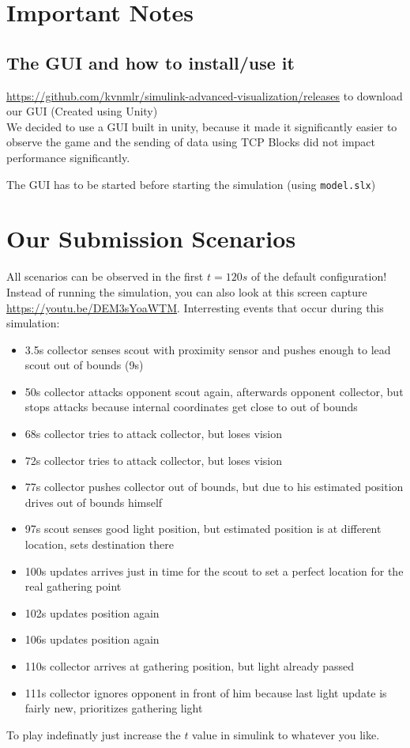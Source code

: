 \documentclass[12pt]{article}
\begin{document}
\lstset{language=C++}

\section*{Important Notes}

\subsection*{The GUI and how to install/use it}
\url{https://github.com/kvnmlr/simulink-advanced-visualization/releases}
to download our GUI (Created using Unity)\\

We decided to use a GUI built in unity, because it made it significantly easier to observe the game and the sending of data using TCP Blocks did not impact performance significantly.

The GUI has to be started before starting the simulation (using \verb!model.slx!)

\section*{Our Submission Scenarios}
All scenarios can be observed in the first $t=120s$ of the default configuration!\\

Instead of running the simulation, you can also look at this screen capture \url{https://youtu.be/DEM3sYoaWTM}. Interresting events that occur during this simulation:
\begin{itemize}
  \item 3.5s collector senses scout with proximity sensor and pushes enough to lead scout out of bounds (9s)
  \item 50s collector attacks opponent scout again, afterwards opponent collector, but stops attacks because internal coordinates get close to out of bounds
  \item 68s collector tries to attack collector, but loses vision
  \item 72s collector tries to attack collector, but loses vision
  \item 77s collector pushes collector out of bounds, but due to his estimated position drives out of bounds himself
  \item 97s scout senses good light position, but estimated position is at different location, sets destination there
  \item 100s updates arrives just in time for the scout to set a perfect location for the real gathering point
  \item 102s updates position again
  \item 106s updates position again
  \item 110s collector arrives at gathering position, but light already passed
  \item 111s collector ignores opponent in front of him because last light update is fairly new, prioritizes gathering light
\end{itemize}

To play indefinatly just increase the $t$ value in simulink to whatever you like.
\end{document}
